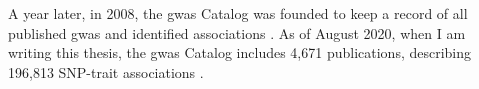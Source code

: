A year later, in 2008, the \gls{gwas} Catalog was founded to keep a record of all published \gls{gwas} and identified associations \cite{welter2014nhgri}.
As of August 2020, when I am writing this thesis, the \gls{gwas} Catalog includes 4,671 publications, describing 196,813
SNP-trait
associations
\cite{macarthur2017new}.\\




